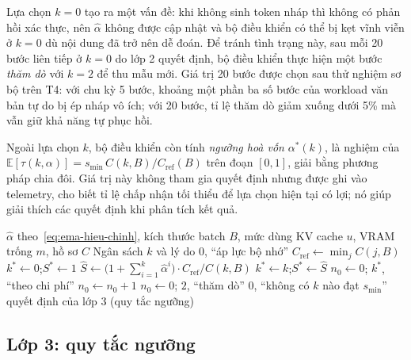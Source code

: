 Lựa chọn $k=0$ tạo ra một vấn đề: khi không sinh token nháp thì không có phản hồi xác thực, nên $\hat{\alpha}$ không được cập nhật và bộ điều khiển có thể bị kẹt vĩnh viễn ở $k=0$ dù nội dung đã trở nên dễ đoán. Để tránh tình trạng này, sau mỗi 20 bước liên tiếp ở $k=0$ do lớp 2 quyết định, bộ điều khiển thực hiện một bước \textit{thăm dò} với $k=2$ để thu mẫu mới. Giá trị 20 bước được chọn sau thử nghiệm sơ bộ trên T4: với chu kỳ 5 bước, khoảng một phần ba số bước của workload văn bản tự do bị ép nháp vô ích; với 20 bước, tỉ lệ thăm dò giảm xuống dưới 5\% mà vẫn giữ khả năng tự phục hồi.

Ngoài lựa chọn $k$, bộ điều khiển còn tính \textit{ngưỡng hoà vốn} $\alpha^\ast(k)$, là nghiệm của $\mathbb{E}[\tau(k, \alpha)] = s_{\min}\, C(k,B)/C_{\text{ref}}(B)$ trên đoạn $[0,1]$, giải bằng phương pháp chia đôi. Giá trị này không tham gia quyết định nhưng được ghi vào telemetry, cho biết tỉ lệ chấp nhận tối thiểu để lựa chọn hiện tại có lợi; nó giúp giải thích các quyết định khi phân tích kết quả.

\begin{algorithm}[htbp]
\caption{Chọn ngân sách nháp cho một yêu cầu tại một bước lập lịch}
\label{alg:chon-k}
\begin{algorithmic}[1]
\Require $\hat{\alpha}$ theo~\eqref{eq:ema-hieu-chinh}, kích thước batch $B$, mức dùng KV cache $u$, VRAM trống $m$, hồ sơ $C$
\Ensure Ngân sách $k$ và lý do
  \State \Return $0$, ``áp lực bộ nhớ'' 
\EndIf
{} 
  \State $C_{\text{ref}} \gets \min_{j} C(j, B)$
  \State $k^\ast \gets 0$;\quad $S^\ast \gets 1$
    \State $\hat{S} \gets \bigl(1 + \sum_{i=1}^{k}\hat{\alpha}^{i}\bigr) \cdot C_{\text{ref}} / C(k,B)$
     \State $k^\ast \gets k$;\quad $S^\ast \gets \hat{S}$ \EndIf
  \EndFor
   \State $n_0 \gets 0$; \Return $k^\ast$, ``theo chi phí'' \EndIf
  \State $n_0 \gets n_0 + 1$
   \State $n_0 \gets 0$; \Return $2$, ``thăm dò'' \EndIf
  \State \Return $0$, ``không có $k$ nào đạt $s_{\min}$''
\EndIf
\State \Return quyết định của lớp 3 (quy tắc ngưỡng) 
\end{algorithmic}
\end{algorithm}

\subsection{Lớp 3: quy tắc ngưỡng}

